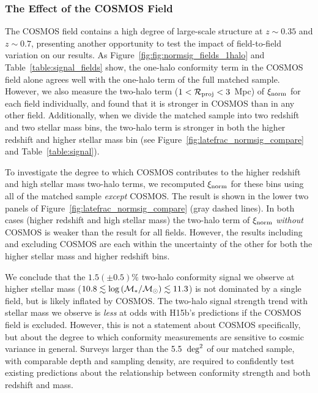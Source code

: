 
\subsubsection{The Effect of the COSMOS Field}\label{sec:cosmos}

The COSMOS field contains a high degree of large-scale structure at $z\sim0.35$ and $z\sim0.7$, presenting another opportunity to test the impact of field-to-field variation on our results.
As Figure~\ref{fig:fig:normsig_fields_1halo} and Table~\ref{table:signal_fields} show, the one-halo conformity term in the COSMOS field alone agrees well with the one-halo term of the full matched sample.
However, we also measure the two-halo term (${1<\mathcal{R}_{\text{proj}}<3}$~Mpc) of $\signorm$ for each field individually, and found that it is stronger in COSMOS than in any other field.
Additionally, when we divide the matched sample into two redshift and two stellar mass bins, the two-halo term is stronger in both the higher redshift and higher stellar mass bin (see Figure~\ref{fig:latefrac_normsig_compare} and Table~\ref{table:signal}).

To investigate the degree to which COSMOS contributes to the higher redshift and high stellar mass two-halo terms, we recomputed $\signorm$ for these bins using all of the matched sample \emph{except} COSMOS.
The result is shown in the lower two panels of Figure~\ref{fig:latefrac_normsig_compare} (gray dashed lines).
In both cases (higher redshift and high stellar mass) the two-halo term of $\signorm$ \emph{without} COSMOS is weaker than the result for all fields.
However, the results including and excluding COSMOS are each within the uncertainty of the other for both the higher stellar mass and higher redshift bins.

We conclude that the $1.5(\pm0.5)\%$ two-halo conformity signal we observe at higher stellar mass (${10.8\lesssim \logM
 \lesssim11.3}$) is not dominated by a single field, but is likely inflated by COSMOS.
The two-halo signal strength trend with stellar mass we observe is \emph{less} at odds with H15b's predictions if the COSMOS field is excluded.
However, this is not a statement about COSMOS specifically, but about the degree to which conformity measurements are sensitive to cosmic variance in general.
Surveys larger than the 5.5~$\degsq$ of our matched sample, with comparable depth and sampling density, are required
to confidently test existing predictions about the relationship between conformity strength and both redshift and mass.

